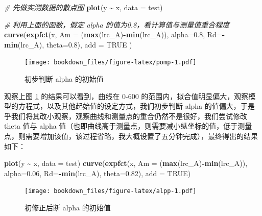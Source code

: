 \documentclass[
]{krantz}
\makeatletter
\newenvironment{Shaded}{\begin{snugshade}}{\end{snugshade}}
\newcommand{\CommentTok}[1]{\textcolor[rgb]{0.56,0.35,0.01}{\textit{#1}}}
\newcommand{\DataTypeTok}[1]{\textcolor[rgb]{0.13,0.29,0.53}{#1}}
\newcommand{\FloatTok}[1]{\textcolor[rgb]{0.00,0.00,0.81}{#1}}
\newcommand{\KeywordTok}[1]{\textcolor[rgb]{0.13,0.29,0.53}{\textbf{#1}}}
\newcommand{\NormalTok}[1]{#1}
\newcommand{\OperatorTok}[1]{\textcolor[rgb]{0.81,0.36,0.00}{\textbf{#1}}}
\newcommand{\OtherTok}[1]{\textcolor[rgb]{0.56,0.35,0.01}{#1}}
\newcommand{\StringTok}[1]{\textcolor[rgb]{0.31,0.60,0.02}{#1}}
\newenvironment{kframe}{%
\medskip{}
\setlength{\fboxsep}{.8em}
 \def\at@end@of@kframe{}%
 \ifinner\ifhmode%
  \def\at@end@of@kframe{\end{minipage}}%
  \begin{minipage}{\columnwidth}%
 \fi\fi%
 \def\FrameCommand##1{\hskip\@totalleftmargin \hskip-\fboxsep
 \colorbox{shadecolor}{##1}\hskip-\fboxsep
     \hskip-\linewidth \hskip-\@totalleftmargin \hskip\columnwidth}%
 \MakeFramed {\advance\hsize-\width
   \@totalleftmargin\z@ \linewidth\hsize
   \@setminipage}}%
 {\par\unskip\endMakeFramed%
 \at@end@of@kframe}
\renewenvironment{Shaded}{\begin{kframe}}{\end{kframe}}
\makeatother
\begin{document}
\begin{Shaded}
\begin{Highlighting}[]
\CommentTok{\# 先做实测数据的散点图}
\KeywordTok{plot}\NormalTok{(y }\OperatorTok{\textasciitilde{}}\StringTok{ }\NormalTok{x, }\DataTypeTok{data =}\NormalTok{ test)}

\CommentTok{\# 利用上面的函数，假定 alpha 的值为0.8，看计算值与测量值重合程度}
\KeywordTok{curve}\NormalTok{(}\KeywordTok{expfct}\NormalTok{(x, }\DataTypeTok{Am =}\NormalTok{ (}\KeywordTok{max}\NormalTok{(lrc\_A)}\OperatorTok{{-}}\KeywordTok{min}\NormalTok{(lrc\_A)),}
     \DataTypeTok{alpha=}\FloatTok{0.8}\NormalTok{, }\DataTypeTok{Rd=}\OperatorTok{{-}}\KeywordTok{min}\NormalTok{(lrc\_A), }\DataTypeTok{theta=}\FloatTok{0.8}\NormalTok{), }\DataTypeTok{add =} \OtherTok{TRUE}
\NormalTok{             )}
\end{Highlighting}
\end{Shaded}

\begin{figure}
\centering
\texttt{[image: bookdown\_files/figure-latex/pomp-1.pdf]}
\caption{\label{fig:pomp}初步判断 alpha 的初始值}
\end{figure}

观察上图 \ref{fig:pomp} 的结果可以看到，曲线在 0-600 的范围内，拟合值明显偏大，观察模型的方程式，以及其他起始值的设定方式，我们初步判断 alpha 的值偏大，于是乎我们将其改小观察，观察曲线和测量点的重合仍然不是很好，我们尝试修改 theta 值与 alpha 值（也即曲线高于测量点，则需要减小纵坐标的值，低于测量点，则需要增加该值，该过程省略，我大概设置了五分钟完成），最终得出的结果如下：

\begin{Shaded}
\begin{Highlighting}[]
\KeywordTok{plot}\NormalTok{(y }\OperatorTok{\textasciitilde{}}\StringTok{ }\NormalTok{x, }\DataTypeTok{data =}\NormalTok{ test)}
\KeywordTok{curve}\NormalTok{(}\KeywordTok{expfct}\NormalTok{(x, }\DataTypeTok{Am =}\NormalTok{ (}\KeywordTok{max}\NormalTok{(lrc\_A)}\OperatorTok{{-}}\KeywordTok{min}\NormalTok{(lrc\_A)),}
     \DataTypeTok{alpha=}\FloatTok{0.06}\NormalTok{, }\DataTypeTok{Rd=}\OperatorTok{{-}}\KeywordTok{min}\NormalTok{(lrc\_A), }\DataTypeTok{theta=}\FloatTok{0.82}\NormalTok{), }\DataTypeTok{add =} \OtherTok{TRUE}\NormalTok{)}
\end{Highlighting}
\end{Shaded}

\begin{figure}
\centering
\texttt{[image: bookdown\_files/figure-latex/alpp-1.pdf]}
\caption{\label{fig:alpp}初修正后断 alpha 的初始值}
\end{figure}
\end{document}
